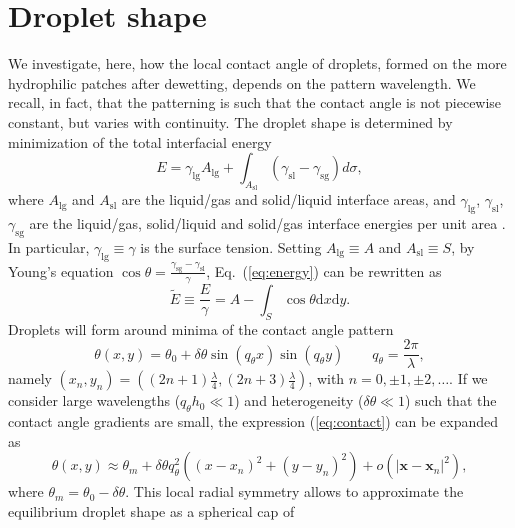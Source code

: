 \documentclass[amsmath,amssymb,showpacs,prl,superscriptaddress,notitlepage]{revtex4-1}
\begin{document}
\section{Droplet shape}\label{sec:SMdroplet}

\noindent We investigate, here, how the local contact angle of droplets, formed on the more
hydrophilic patches after dewetting, depends on the pattern wavelength. We recall, in fact,
that the patterning is such that the contact angle is not piecewise constant, but varies
with continuity.
The droplet shape is determined by minimization of the total interfacial energy
\begin{equation}\label{eq:energy}
E = \gamma_{\text{lg}} A_{\text{lg}} + \int_{A_{\text{sl}}} (\gamma_{\text{sl}} - \gamma_{\text{sg}})d \sigma,
\end{equation}
where $A_{\text{lg}}$ and $A_{\text{sl}}$ are the liquid/gas and solid/liquid interface areas, and $\gamma_{\text{lg}}$, $\gamma_{\text{sl}}$,
$\gamma_{\text{sg}}$ are the liquid/gas, solid/liquid and solid/gas interface energies 
per unit area \cite{Wu2020}. 
In particular, $\gamma_{\text{lg}} \equiv \gamma$ is the surface tension.
Setting $A_{\text{lg}} \equiv A$ and $A_{\text{sl}} \equiv S$, by Young's equation 
$\cos \theta = \frac{\gamma_{\text{sg}} - \gamma_{\text{sl}}}{\gamma}$,
Eq.~(\ref{eq:energy}) can be rewritten as
\begin{equation}\label{eq:energyoung}
\tilde{E} \equiv \frac{E}{\gamma} = A - \int_S \cos \theta \text{d}x \text{d}y.
\end{equation}
Droplets will form around minima of the contact angle pattern
\begin{equation}\label{eq:contact}
\theta(x,y) = \theta_0 + \delta \theta \sin(q_{\theta} x) \sin (q_{\theta} y) \qquad q_{\theta} = \frac{2\pi}{\lambda},
\end{equation}
namely $(x_n,y_n) = \left((2n+1)\frac{\lambda}{4},(2n+3)\frac{\lambda}{4}\right)$, with
$n=0,\pm 1, \pm 2,\dots$.
If we consider large wavelengths ($q_{\theta} h_0 \ll 1$) and heterogeneity
($\delta \theta \ll 1$) such that the contact angle gradients are small, the
expression (\ref{eq:contact}) can be expanded as
\begin{equation}\label{eq:contact2}
\theta(x,y) \approx \theta_m + \delta \theta q_{\theta}^2 ((x-x_n)^2 + (y - y_n)^2) + o(|\mathbf{x}-\mathbf{x}_n|^2),
\end{equation}
where $\theta_m = \theta_0 - \delta \theta$.
This local radial symmetry allows to approximate the equilibrium droplet shape as a spherical cap of
\end{document}
